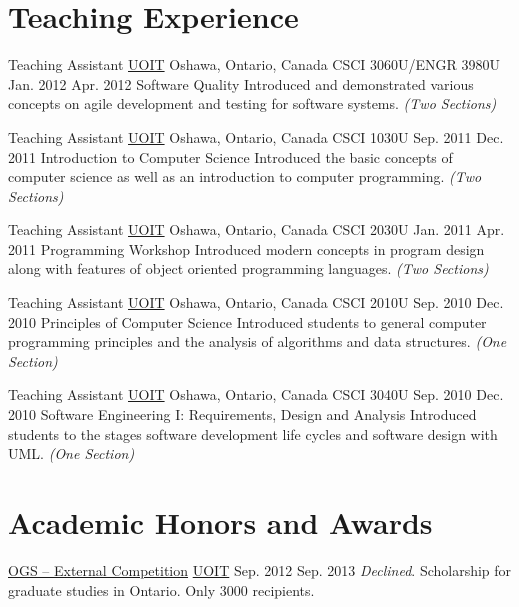   \section{Teaching Experience}

  \teachingEntry
    {Teaching Assistant}
    {\href{http://www.uoit.ca/}{UOIT}}
    {Oshawa, Ontario, Canada}
    {CSCI 3060U/ENGR 3980U}
    {Jan. 2012}
    {Apr. 2012}
    {Software Quality}
    {Introduced and demonstrated various concepts on agile development and testing for software systems. \textit{(Two Sections)}}

  \teachingEntry
    {Teaching Assistant}
    {\href{http://www.uoit.ca/}{UOIT}}
    {Oshawa, Ontario, Canada}
    {CSCI 1030U}
    {Sep. 2011}
    {Dec. 2011}
    {Introduction to Computer Science}
    {Introduced the basic concepts of computer science as well as an introduction to computer programming. \textit{(Two Sections)}}

  \teachingEntry
    {Teaching Assistant}
    {\href{http://www.uoit.ca/}{UOIT}}
    {Oshawa, Ontario, Canada}
    {CSCI 2030U}
    {Jan. 2011}
    {Apr. 2011}
    {Programming Workshop}
    {Introduced modern concepts in program design along with features of object oriented programming languages. \textit{(Two Sections)}}

  \teachingEntry
    {Teaching Assistant}
    {\href{http://www.uoit.ca/}{UOIT}}
    {Oshawa, Ontario, Canada}
    {CSCI 2010U}
    {Sep. 2010}
    {Dec. 2010}
    {Principles of Computer Science}
    {Introduced students to general computer programming principles and the analysis of algorithms and data structures. \textit{(One Section)}}

  \teachingEntry
    {Teaching Assistant}
    {\href{http://www.uoit.ca/}{UOIT}}
    {Oshawa, Ontario, Canada}
    {CSCI 3040U}
    {Sep. 2010}
    {Dec. 2010}
    {Software Engineering I: Requirements, Design and Analysis}
    {Introduced students to the stages software development life cycles and software design with UML. \textit{(One Section)}}

  \section{Academic Honors and Awards}{}

  \academicAwardsEntry
    {\href{https://osap.gov.on.ca/OSAPPortal/en/A-ZListofAid/TCONT003465.html}{OGS -- External Competition}}
    {\href{http://uoit.ca/}{UOIT}}
    {Sep. 2012}
    {Sep. 2013}
    {\textit{Declined}. Scholarship for graduate studies in Ontario. Only 3000 recipients.}


